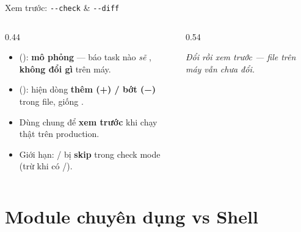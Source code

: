 \documentclass[aspectratio=169,11pt,xcolor=table]{beamer}
\begin{document}
\begin{frame}[fragile]{Xem trước: \texttt{-{}-check} \& \texttt{-{}-diff}}
  \begin{columns}[c]
    \begin{column}{0.44\textwidth}
      \begin{itemize}\small\setlength{\itemsep}{0.25cm}
        \item {} (): \textbf{mô phỏng} — báo task nào \emph{sẽ}
              , \textbf{không đổi gì} trên máy.
        \item {} (): hiện dòng \textbf{thêm (+) / bớt (−)} trong file,
              giống .
        \item Dùng chung để \textbf{xem trước} khi chạy thật trên production.
        \item Giới hạn: / bị \textbf{skip} trong check mode
              (trừ khi có /).
      \end{itemize}
    \end{column}
    \begin{column}{0.54\textwidth}
      {\scriptsize\itshape Đổi  rồi xem trước — file trên máy vẫn chưa đổi.}
    \end{column}
  \end{columns}
\end{frame}

\section{Module chuyên dụng vs Shell}
\end{document}
